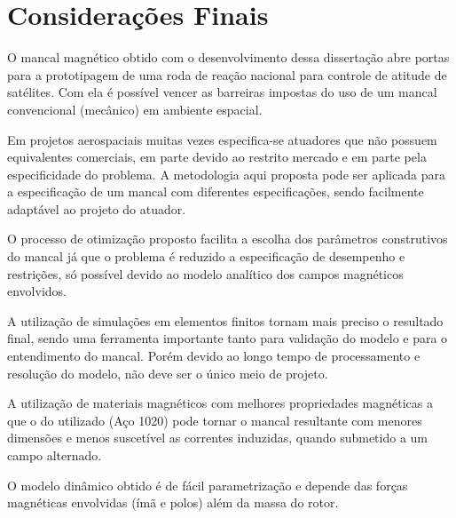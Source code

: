 \pagestyle{empty}
	\cleardoublepage
\pagestyle{fancy}

\chapter{Considerações Finais} \label{Cap:Consideracoes:Finais}


O mancal magnético obtido com o desenvolvimento dessa dissertação abre portas para a prototipagem de uma roda de reação nacional para controle de atitude de satélites. Com ela é possível vencer as barreiras impostas do uso de um mancal convencional (mecânico) em ambiente espacial.

Em projetos aerospaciais muitas vezes especifica-se atuadores que não possuem equivalentes comerciais, em parte devido ao restrito mercado e em parte pela especificidade do problema. A metodologia aqui proposta pode ser aplicada para a especificação de um mancal com diferentes especificações, sendo facilmente adaptável ao projeto do atuador.

O processo de otimização proposto facilita a escolha dos parâmetros construtivos do mancal já que o problema é reduzido a especificação de desempenho e restrições, só possível devido ao modelo analítico dos campos magnéticos envolvidos.

A utilização de simulações em elementos finitos tornam mais preciso o resultado final, sendo uma ferramenta importante tanto para validação do modelo e para o entendimento do mancal. Porém devido ao longo tempo de processamento e resolução do modelo, não deve ser o único meio de projeto.

A utilização de materiais magnéticos com melhores propriedades magnéticas a que o do utilizado (Aço 1020) pode tornar o mancal resultante com menores dimensões e menos suscetível as correntes induzidas, quando submetido a um campo alternado. 

O modelo dinâmico obtido é de fácil parametrização e depende das forças magnéticas envolvidas (ímã e polos) além da massa do rotor.  








